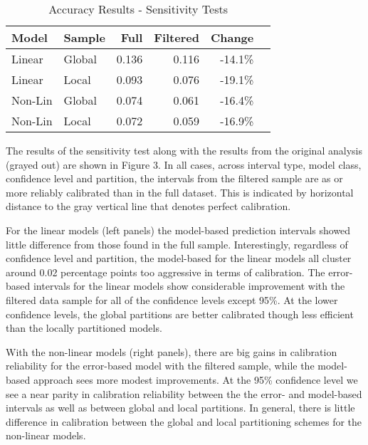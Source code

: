 \documentclass[colTwo]{anon}
\theoremstyle{definition}
\begin{document}
\begin{table}[h]
\centering
\begin{tabular}{l|l|r|r|r|r}
\hline
\textbf{Model} & \textbf{Sample} & \textbf{Full} & \textbf{Filtered} & \textbf{Change}\\
\hline
Linear & Global & 0.136 & 0.116 & -14.1\% \\
Linear & Local & 0.093 & 0.076 & -19.1\% \\
\hline
Non-Lin & Global & 0.074 & 0.061 & -16.4\% \\
Non-Lin & Local & 0.072 & 0.059 & -16.9\% \\
\hline
\end{tabular}
\caption{Accuracy Results - Sensitivity Tests}
\label{table:7}
\end{table}

The results of the sensitivity test along with the results from the original analysis (grayed out) are shown in Figure 3. In all cases, across interval type, model class, confidence level and partition, the intervals from the filtered sample are as or more reliably calibrated than in the full dataset. This is indicated by horizontal distance to the gray vertical line that denotes perfect calibration.

For the linear models (left panels) the model-based prediction intervals showed little difference from those found in the full sample.  Interestingly, regardless of confidence level and partition, the model-based for the linear models all cluster around 0.02 percentage points too aggressive in terms of calibration.  The error-based intervals for the linear models show considerable improvement with the filtered data sample for all of the confidence levels except 95\%. At the lower confidence levels, the global partitions are better calibrated though less efficient than the locally partitioned models.

With the non-linear models (right panels), there are big gains in calibration reliability for the error-based model with the filtered sample, while the model-based approach sees more modest improvements.  At the 95\% confidence level we see a near parity in calibration reliability between the the error- and model-based intervals as well as between global and local partitions.  In general, there is little difference in calibration between the global and local partitioning schemes for the non-linear models.
\end{document}
